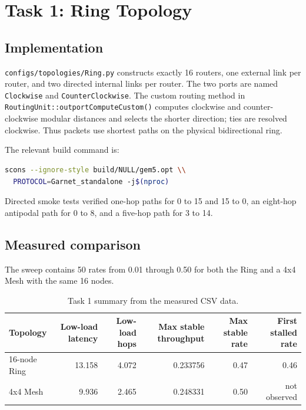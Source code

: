 \documentclass[11pt,a4paper]{article}
\newcommand{\code}[1]{\texttt{#1}}
\begin{document}
\section{Task 1: Ring Topology}

\subsection{Implementation}

\code{configs/topologies/Ring.py} constructs exactly 16 routers, one external
link per router, and two directed internal links per router. The two ports are
named \code{Clockwise} and \code{CounterClockwise}. The custom routing method
in \code{RoutingUnit::outportComputeCustom()} computes clockwise and
counter-clockwise modular distances and selects the shorter direction; ties
are resolved clockwise. Thus packets use shortest paths on the physical
bidirectional ring.

The relevant build command is:

\begin{lstlisting}[language=bash]
scons --ignore-style build/NULL/gem5.opt \\
  PROTOCOL=Garnet_standalone -j$(nproc)
\end{lstlisting}

Directed smoke tests verified one-hop paths for 0 to 15 and 15 to 0, an
eight-hop antipodal path for 0 to 8, and a five-hop path for 3 to 14.

\subsection{Measured comparison}

The sweep contains 50 rates from 0.01 through 0.50 for both the Ring and a
4x4 Mesh with the same 16 nodes.

\begin{table}[H]
\centering
\small
\caption{Task 1 summary from the measured CSV data.}
\begin{tabular}{lrrrrr}
\toprule
Topology & Low-load latency & Low-load hops & Max stable throughput & Max stable rate & First stalled rate \\
\midrule
16-node Ring & 13.158 & 4.072 & 0.233756 & 0.47 & 0.46 \\
4x4 Mesh & 9.936 & 2.465 & 0.248331 & 0.50 & not observed \\
\bottomrule
\end{tabular}
\end{table}
\end{document}
